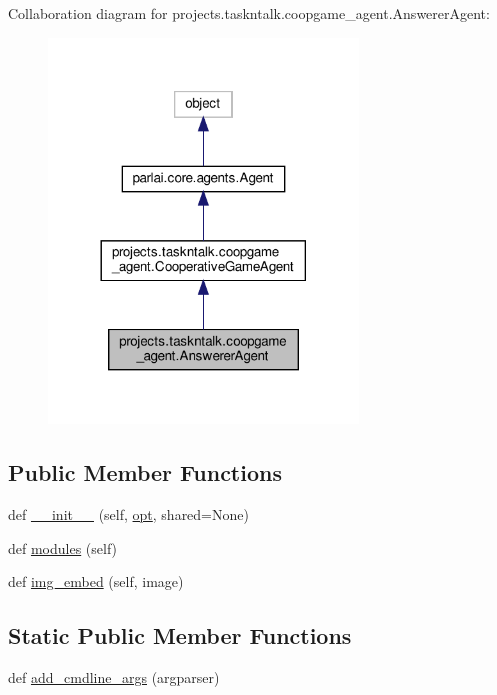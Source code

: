 Collaboration diagram for projects.\+taskntalk.\+coopgame\+\_\+agent.\+Answerer\+Agent\+:
\nopagebreak
\begin{figure}[H]
\begin{center}
\leavevmode
\includegraphics[width=233pt]{d8/d95/classprojects_1_1taskntalk_1_1coopgame__agent_1_1AnswererAgent__coll__graph}
\end{center}
\end{figure}
\subsection*{Public Member Functions}
\begin{DoxyCompactItemize}
\item 
def \hyperlink{classprojects_1_1taskntalk_1_1coopgame__agent_1_1AnswererAgent_a7781c189ee128bbbf7c59536411a5cd8}{\+\_\+\+\_\+init\+\_\+\+\_\+} (self, \hyperlink{classparlai_1_1core_1_1agents_1_1Agent_ab3b45d2754244608c75d4068b90cd051}{opt}, shared=None)
\item 
def \hyperlink{classprojects_1_1taskntalk_1_1coopgame__agent_1_1AnswererAgent_ae75c09cc8f494a77e625a577fea676ec}{modules} (self)
\item 
def \hyperlink{classprojects_1_1taskntalk_1_1coopgame__agent_1_1AnswererAgent_a866af3a411fe6c7d10e34306ea0d681b}{img\+\_\+embed} (self, image)
\end{DoxyCompactItemize}
\subsection*{Static Public Member Functions}
\begin{DoxyCompactItemize}
\item 
def \hyperlink{classprojects_1_1taskntalk_1_1coopgame__agent_1_1AnswererAgent_a41be165d9cb3245e1f41be573020308e}{add\+\_\+cmdline\+\_\+args} (argparser)
\end{DoxyCompactItemize}
